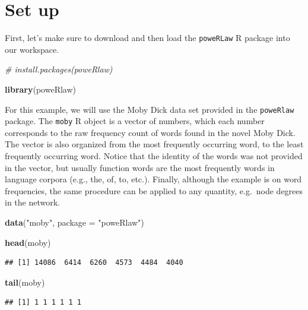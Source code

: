 \documentclass[
]{book}
\newenvironment{Shaded}{\begin{snugshade}}{\end{snugshade}}
\newcommand{\AttributeTok}[1]{\textcolor[rgb]{0.13,0.29,0.53}{#1}}
\newcommand{\CommentTok}[1]{\textcolor[rgb]{0.56,0.35,0.01}{\textit{#1}}}
\newcommand{\FunctionTok}[1]{\textcolor[rgb]{0.13,0.29,0.53}{\textbf{#1}}}
\newcommand{\NormalTok}[1]{#1}
\newcommand{\StringTok}[1]{\textcolor[rgb]{0.31,0.60,0.02}{#1}}
\begin{document}
\section{Set up}\label{set-up-4}

First, let's make sure to download and then load the \texttt{poweRLaw} R package into our workspace.

\begin{Shaded}
\begin{Highlighting}[]
\CommentTok{\# install.packages(\textquotesingle{}poweRlaw\textquotesingle{})}

\FunctionTok{library}\NormalTok{(}\StringTok{\textquotesingle{}poweRlaw\textquotesingle{}}\NormalTok{)}
\end{Highlighting}
\end{Shaded}

For this example, we will use the Moby Dick data set provided in the \texttt{poweRlaw} package. The \texttt{moby} R object is a vector of numbers, which each number corresponds to the raw frequency count of words found in the novel Moby Dick. The vector is also organized from the most frequently occurring word, to the least frequently occurring word. Notice that the identity of the words was not provided in the vector, but usually function words are the most frequently words in language corpora (e.g., the, of, to, etc.). Finally, although the example is on word frequencies, the same procedure can be applied to any quantity, e.g.~node degrees in the network.

\begin{Shaded}
\begin{Highlighting}[]
\FunctionTok{data}\NormalTok{(}\StringTok{"moby"}\NormalTok{, }\AttributeTok{package =} \StringTok{"poweRlaw"}\NormalTok{)}

\FunctionTok{head}\NormalTok{(moby)}
\end{Highlighting}
\end{Shaded}

\begin{verbatim}
## [1] 14086  6414  6260  4573  4484  4040
\end{verbatim}

\begin{Shaded}
\begin{Highlighting}[]
\FunctionTok{tail}\NormalTok{(moby)}
\end{Highlighting}
\end{Shaded}

\begin{verbatim}
## [1] 1 1 1 1 1 1
\end{verbatim}
\end{document}
